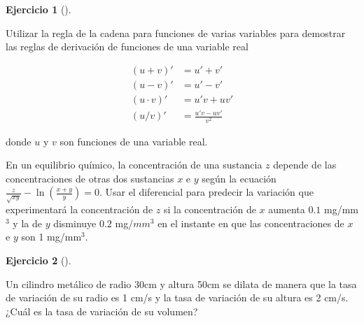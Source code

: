 \documentclass[
  a4paper,
]{scrreport}
\theoremstyle{definition}
\newtheorem{exercise}{Ejercicio}[chapter]
\theoremstyle{remark}
\begin{document}
\begin{exercise}[]\protect\hypertarget{exr-reglas-derivacion}{}\label{exr-reglas-derivacion}

Utilizar la regla de la cadena para funciones de varias variables para
demostrar las reglas de derivación de funciones de una variable real

\begin{align*}
(u+v)' &= u' + v'\\
(u-v)' &= u' - v'\\
(u\cdot v)' &= u'v + uv'\\
(u/v)' &= \frac{u'v-uv'}{v^2}
\end{align*}

donde \(u\) y \(v\) son funciones de una variable real.

\end{exercise}

\begin{tcolorbox}[enhanced jigsaw, toprule=.15mm, bottomrule=.15mm, coltitle=black, toptitle=1mm, breakable, left=2mm, arc=.35mm, title=\textcolor{quarto-callout-tip-color}{\faLightbulb}\hspace{0.5em}{Solución}, titlerule=0mm, colback=white, colbacktitle=quarto-callout-tip-color!10!white, colframe=quarto-callout-tip-color-frame, bottomtitle=1mm, rightrule=.15mm, leftrule=.75mm, opacitybacktitle=0.6, opacityback=0]

En un equilibrio químico, la concentración de una sustancia \(z\)
depende de las concentraciones de otras dos sustancias \(x\) e \(y\)
según la ecuación
\(\frac{z}{\sqrt{xy}}-\ln\left(\frac{x+y}{y}\right) = 0\). Usar el
diferencial para predecir la variación que experimentará la
concentración de \(z\) si la concentración de \(x\) aumenta \(0.1\)
mg/mm\(^3\) y la de \(y\) disminuye \(0.2\) mg/\(mm^3\) en el instante
en que las concentraciones de \(x\) e \(y\) son 1 mg/mm\(^3\).

\end{tcolorbox}

\begin{exercise}[]\protect\hypertarget{exr-variacion-volumen-cilindro}{}\label{exr-variacion-volumen-cilindro}

Un cilindro metálico de radio 30cm y altura 50cm se dilata de manera que
la tasa de variación de su radio es 1 cm/s y la tasa de variación de su
altura es 2 cm/s. ¿Cuál es la tasa de variación de su volumen?

\end{exercise}
\end{document}
